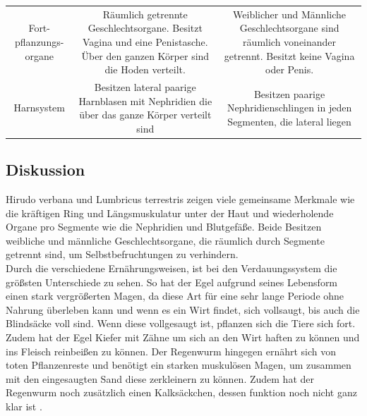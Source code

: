 \documentclass[oneside,10pt,a4paper]{report}
\begin{document}
\begin{table}[H]
\begin{tabular}{c c c}
						\midrule
						\multirow{4}{*}{\parbox[t]{2cm}{Fort- pflanzungs- organe}} & \multirow{4}{*}{\parbox[t]{6cm}{Räumlich getrennte Geschlechtsorgane. Besitzt Vagina und eine Penistasche. Über den ganzen Körper sind die Hoden verteilt.}}&\multirow{4}{*}{\parbox[t]{6cm}{Weiblicher und Männliche Geschlechtsorgane sind räumlich voneinander getrennt. Besitzt keine Vagina oder Penis.}}\\
						& &\\
						&&\\
						&&\\
						\midrule
						\multirow{3}{*}{\parbox[t]{2cm}{Harnsystem}}& \multirow{3}{*}{\parbox[t]{6cm}{Besitzen lateral paarige  Harnblasen mit Nephridien die über das ganze Körper verteilt sind}}&\multirow{3}{*}{\parbox[t]{6cm}{Besitzen paarige Nephridienschlingen in jeden Segmenten, die lateral liegen}}\\
						& &\\
						&&\\
						\bottomrule
					\end{tabular}
				\end{table}
				
			\subsection{Diskussion}
				Hirudo verbana und Lumbricus terrestris zeigen viele gemeinsame Merkmale wie die kräftigen Ring und Längsmuskulatur unter der Haut und wiederholende Organe pro Segmente wie die Nephridien und Blutgefäße. Beide Besitzen weibliche und männliche Geschlechtsorgane, die räumlich durch Segmente getrennt sind, um Selbstbefruchtungen zu verhindern.\\
				Durch die verschiedene Ernährungsweisen, ist bei den Verdauungssystem die größsten Unterschiede zu sehen. So hat der Egel aufgrund seines Lebensform einen stark vergrößerten Magen, da diese Art für eine sehr lange Periode ohne Nahrung überleben kann und wenn es ein Wirt findet, sich vollsaugt, bis auch die Blindsäcke voll sind. Wenn diese vollgesaugt ist, pflanzen sich die Tiere sich fort. Zudem hat der Egel Kiefer mit Zähne um sich an den Wirt haften zu können und ins Fleisch reinbeißen zu können. Der Regenwurm hingegen ernährt sich von toten Pflanzenreste und benötigt ein starken muskulösen Magen, um zusammen mit den eingesaugten Sand diese zerkleinern zu können. Zudem hat der Regenwurm noch zusätzlich einen Kalksäckchen, dessen funktion noch nicht ganz klar ist \cite{Kühkental}. 
				
\end{document}
